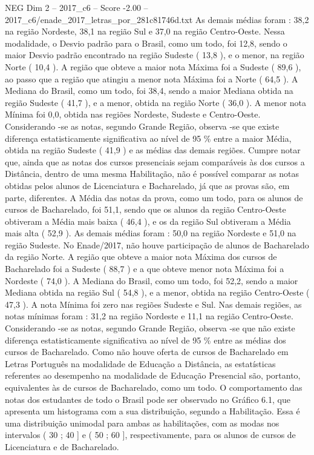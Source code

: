 \begin{textsample}{NEG Dim 2 – 2017\_c6 – Score -2.00 – 2017\_c6/enade\_2017\_letras\_por\_281c81746d.txt}
As demais médias foram : 38,2 na região Nordeste, 38,1 na região Sul e 37,0 na região Centro-Oeste.
Nessa modalidade, o Desvio padrão para o Brasil, como um todo, foi 12,8, sendo o maior Desvio padrão encontrado na região Sudeste ( 13,8 ), e o menor, na região Norte ( 10,4 ).
A região que obteve a maior nota Máxima foi a Sudeste ( 89,6 ), ao passo que a região que atingiu a menor nota Máxima foi a Norte ( 64,5 ).
A Mediana do Brasil, como um todo, foi 38,4, sendo a maior Mediana obtida na região Sudeste ( 41,7 ), e a menor, obtida na região Norte ( 36,0 ).
A menor nota Mínima foi 0,0, obtida nas regiões Nordeste, Sudeste e Centro-Oeste.
Considerando -se as notas, segundo Grande Região, observa -se que existe diferença estatisticamente significativa ao nível de 95 \% entre a maior Média, obtida na região Sudeste ( 41,9 ) e as médias das demais regiões.
Cumpre notar que, ainda que as notas dos cursos presenciais sejam comparáveis às dos cursos a Distância, dentro de uma mesma Habilitação, não é possível comparar as notas obtidas pelos alunos de Licenciatura e Bacharelado, já que as provas são, em parte, diferentes.
A Média das notas da prova, como um todo, para os alunos de cursos de Bacharelado, foi 51,1, sendo que os alunos da região Centro-Oeste obtiveram a Média mais baixa ( 46,4 ), e os da região Sul obtiveram a Média mais alta ( 52,9 ).
As demais médias foram : 50,0 na região Nordeste e 51,0 na região Sudeste.
No Enade/2017, não houve participação de alunos de Bacharelado da região Norte.
A região que obteve a maior nota Máxima dos cursos de Bacharelado foi a Sudeste ( 88,7 ) e a que obteve menor nota Máxima foi a Nordeste ( 74,0 ).
A Mediana do Brasil, como um todo, foi 52,2, sendo a maior Mediana obtida na região Sul ( 54,8 ), e a menor, obtida na região Centro-Oeste ( 47,3 ).
A nota Mínima foi zero nas regiões Sudeste e Sul.
Nas demais regiões, as notas mínimas foram : 31,2 na região Nordeste e 11,1 na região Centro-Oeste.
Considerando -se as notas, segundo Grande Região, observa -se que não existe diferença estatisticamente significativa ao nível de 95 \% entre as médias dos cursos de Bacharelado.
Como não houve oferta de cursos de Bacharelado em Letras Português na modalidade de Educação a Distância, as estatísticas referentes ao desempenho na modalidade de Educação Presencial são, portanto, equivalentes às de cursos de Bacharelado, como um todo.
O comportamento das notas dos estudantes de todo o Brasil pode ser observado no Gráfico 6.1, que apresenta um histograma com a sua distribuição, segundo a Habilitação.
Essa é uma distribuição unimodal para ambas as habilitações, com as modas nos intervalos ( 30 ; 40 ] e ( 50 ; 60 ], respectivamente, para os alunos de cursos de Licenciatura e de Bacharelado.

\end{textsample}
